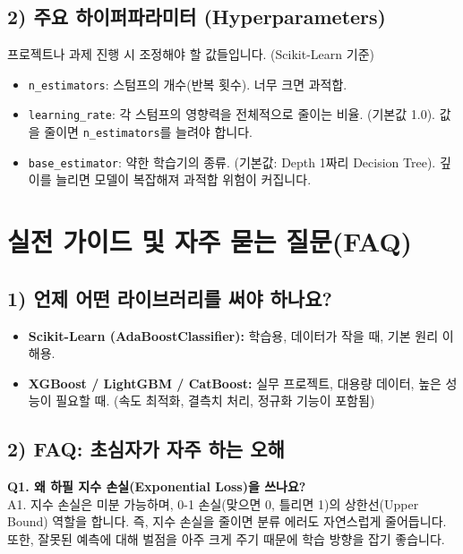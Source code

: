 \documentclass[11pt,a4paper]{book}
\theoremstyle{definition}
\begin{document}
\subsection{2) 주요 하이퍼파라미터 (Hyperparameters)}
프로젝트나 과제 진행 시 조정해야 할 값들입니다. (Scikit-Learn 기준)
\begin{itemize}
    \item \texttt{n\_estimators}: 스텀프의 개수(반복 횟수). 너무 크면 과적합.
    \item \texttt{learning\_rate}: 각 스텀프의 영향력을 전체적으로 줄이는 비율. (기본값 1.0). 값을 줄이면 \texttt{n\_estimators}를 늘려야 합니다.
    \item \texttt{base\_estimator}: 약한 학습기의 종류. (기본값: Depth 1짜리 Decision Tree). 깊이를 늘리면 모델이 복잡해져 과적합 위험이 커집니다.
\end{itemize}

\section{실전 가이드 및 자주 묻는 질문(FAQ)}

\subsection{1) 언제 어떤 라이브러리를 써야 하나요?}
\begin{itemize}
    \item \textbf{Scikit-Learn (AdaBoostClassifier):} 학습용, 데이터가 작을 때, 기본 원리 이해용.
    \item \textbf{XGBoost / LightGBM / CatBoost:} 실무 프로젝트, 대용량 데이터, 높은 성능이 필요할 때. (속도 최적화, 결측치 처리, 정규화 기능이 포함됨)
\end{itemize}

\subsection{2) FAQ: 초심자가 자주 하는 오해}

\textbf{Q1. 왜 하필 지수 손실(Exponential Loss)을 쓰나요?} \\
A1. 지수 손실은 미분 가능하며, 0-1 손실(맞으면 0, 틀리면 1)의 상한선(Upper Bound) 역할을 합니다. 즉, 지수 손실을 줄이면 분류 에러도 자연스럽게 줄어듭니다. 또한, 잘못된 예측에 대해 벌점을 아주 크게 주기 때문에 학습 방향을 잡기 좋습니다.
\end{document}

